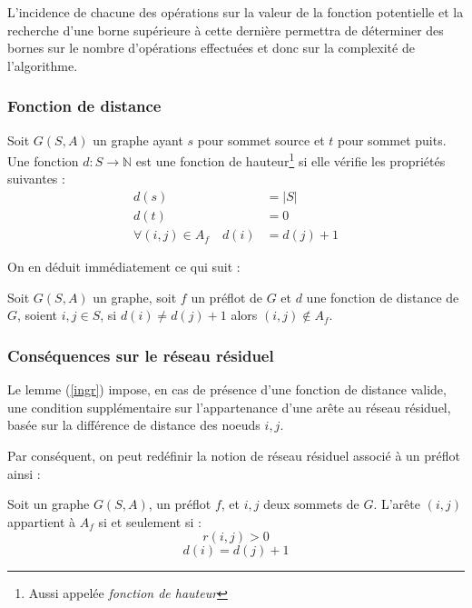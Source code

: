 L'incidence de chacune des opérations sur la valeur de la fonction potentielle et la recherche d'une
borne supérieure à cette dernière permettra de déterminer des bornes sur le nombre d'opérations
effectuées et donc sur la complexité de l'algorithme.

\subsubsection{Fonction de distance}

Soit $G(S, A)$ un graphe ayant $s$ pour sommet source et $t$ pour sommet puits. Une fonction $d: S
\rightarrow \mathbb{N}$ est une fonction de hauteur\footnote{Aussi appelée \emph{fonction de
	hauteur}} si elle vérifie les propriétés suivantes :
\begin{subequations}
	\label{eq:prop_haut}
	\begin{align}
		d(s) &= |S| \label{eq:ph1} \\
		d(t) &= 0   \label{eq:ph2} \\
		\forall (i,j) \in A_f \quad d(i) &= d(j) + 1 \label{eq:ph3} 
	\end{align}
\end{subequations}

On en déduit immédiatement ce qui suit :
\begin{lemma}
	\label{ingr}
	Soit $G(S,A)$ un graphe, soit $f$ un préflot de $G$ et $d$ une fonction de distance de $G$, soient
	$i,j \in S$, si $d(i) \not = d(j) + 1$ alors $(i,j) \not \in A_f$.
\end{lemma}

\subsubsection{Conséquences sur le réseau résiduel}

Le lemme (\ref{ingr}) impose, en cas de présence d'une fonction de distance valide, une condition
supplémentaire sur l'appartenance d'une arête au réseau résiduel, basée sur la différence de
distance des noeuds $i,j$.

Par conséquent, on peut redéfinir la notion de réseau résiduel associé à un préflot ainsi :

Soit un graphe $G(S,A)$, un préflot $f$, et $i,j$ deux sommets de $G$. L'arête $(i,j)$ appartient à
$A_f$ si et seulement si :
\begin{equation}
	r(i,j) > 0
\end{equation}
\begin{equation}
	d(i) = d(j) + 1
\end{equation}

